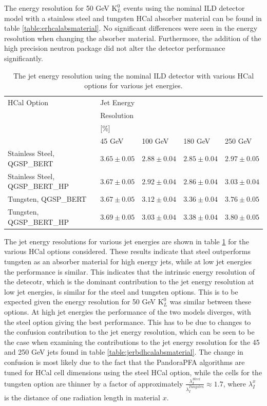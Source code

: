 The energy resolution for 50 GeV $\text{K}^{0}_{L}$ events using the nominal ILD detector model with a stainless steel and tungsten HCal absorber material can be found in table \ref{table:erhcalabsmaterial}.  No significant differences were seen in the energy resolution when changing the absorber material.  Furthermore, the addition of the high precision neutron package did not alter the detector performance significantly.    


\begin{table}[h!]
\centering
\begin{tabular}{ l l l l l }
\hline
HCal Option & Jet Energy & & & \\
 & Resolution & & & \\
 & [\%] & & & \\
 & 45 GeV & 100 GeV & 180 GeV & 250 GeV \\
\hline
Stainless Steel, QGSP\_BERT & $3.65 \pm 0.05$ &$2.88 \pm 0.04$ &$2.85 \pm 0.04$ &$2.97 \pm 0.05$ \\
Stainless Steel, QGSP\_BERT\_HP & $3.67 \pm 0.05$ &$2.92 \pm 0.04$ &$2.86 \pm 0.04$ &$3.03 \pm 0.04$ \\
Tungsten, QGSP\_BERT & $3.67 \pm 0.05$ &$3.12 \pm 0.04$ &$3.36 \pm 0.04$ &$3.76 \pm 0.05$ \\
Tungsten, QGSP\_BERT\_HP & $3.69 \pm 0.05$ &$3.03 \pm 0.04$ &$3.38 \pm 0.04$ &$3.80 \pm 0.05$ \\
\hline
\end{tabular}
\caption[The jet energy resolution using the nominal ILD detector with various HCal options for various jet energies.]{The jet energy resolution using the nominal ILD detector with various HCal options for various jet energies.}
\label{table:jerhcalabsmaterial}
\end{table}

The jet energy resolutions for various jet energies are shown in table \ref{table:jerhcalabsmaterial} for the various HCal options considered.  These results indicate that steel outperforms tungsten as an absorber material for high energy jets, while at low jet energies the performance is similar.  This indicates that the intrinsic energy resolution of the detecotr, which is the dominant contribution to the jet energy resolution at low jet energies, is similar for the steel and tungsten options.  This is to be expected given the energy resolution for 50 GeV $\text{K}^{0}_{L}$ was similar between these options.  At high jet energies the performance of the two models diverges, with the steel option giving the best performance.  This has to be due to changes to the confusion contribution to the jet energy resolution, which can be seen to be the case when examining the contributions to the jet energy resolution for the 45 and 250 GeV jets found in table \ref{table:jerbdhcalabsmaterial}.  The change in confusion is most likely due to the fact that the PandoraPFA algorithms are tuned for HCal cell dimensions using the steel HCal option, while the cells for the tungsten option are thinner by a factor of approximately $\frac{\lambda_{I}^{Steel}}{\lambda_{I}^{Tungsten}} \approx 1.7$, where $\lambda_{I}^{x}$ is the distance of one radiation length in material $x$.  

